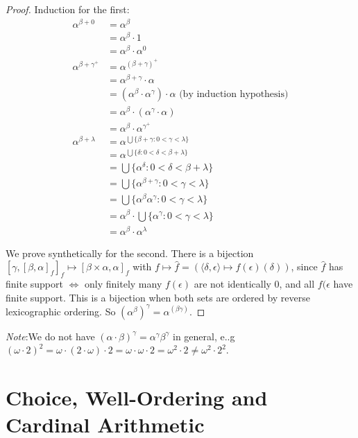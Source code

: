 \documentclass[a4paper]{article}
\theoremstyle{definition}
\newcommand{\note}{\noindent \emph{Note}:\;}
\newcommand{\bra}{\langle}
\newcommand{\ket}{\rangle}
\let\stdsection\section
\renewcommand\section{\newpage\stdsection}
\begin{document}
\begin{proof}
  Induction for the first:
  \begin{align*}
    \alpha^{\beta + 0} &= \alpha^\beta\\
    &= \alpha^\beta\cdot 1\\
    &= \alpha^\beta \cdot \alpha^0\\
    \alpha^{\beta + \gamma^+} &= \alpha^{(\beta + \gamma)^+}\\
    &= \alpha^{\beta + \gamma}\cdot \alpha\\
    &= (\alpha^\beta\cdot \alpha^\gamma)\cdot \alpha\text{ (by induction hypothesis)}\\
    &= \alpha^\beta\cdot(\alpha^\gamma\cdot \alpha)\\
    &= \alpha^\beta\cdot \alpha^{\gamma^+}\\
    \alpha^{\beta + \lambda}&= \alpha^{\bigcup\{\beta + \gamma : 0 < \gamma < \lambda\}}\\
    &= \alpha^{\bigcup\{\delta: 0 < \delta < \beta + \lambda\}}\\
    &= \bigcup \{\alpha^\delta:0 < \delta < \beta + \lambda\}\\
    &= \bigcup \{\alpha^{\beta + \gamma} : 0 < \gamma < \lambda\}\\
    &= \bigcup \{\alpha^{\beta} \alpha^{\gamma} : 0 < \gamma < \lambda\}\\
    &= \alpha^{\beta}\cdot \bigcup \{ \alpha^{\gamma} : 0 < \gamma < \lambda\}\\
    &= \alpha^\beta\cdot \alpha^\lambda
  \end{align*}

  We prove synthetically for the second. There is a bijection $[\gamma, [\beta, \alpha]_f]_f\mapsto[\beta\times\alpha, \alpha]_f$ with $f\mapsto \hat f = (\bra \delta, \epsilon\ket \mapsto f(\epsilon)(\delta))$, since $\hat f$ has finite support $\Leftrightarrow$ only finitely many $f(\epsilon)$ are not identically 0, and all $f(\epsilon$ have finite support. This is a bijection when both sets are ordered by reverse lexicographic ordering. So $(\alpha^\beta)^\gamma = \alpha^(\beta\gamma)$.
\end{proof}

\note We do not have $(\alpha\cdot \beta)^\gamma = \alpha^\gamma\beta^\gamma$ in general, e..g $(\omega\cdot 2)^2 = \omega\cdot (2 \cdot \omega)\cdot 2 = \omega\cdot \omega \cdot 2 = \omega^2 \cdot 2 \not= \omega^2 \cdot 2^2$.

\section{Choice, Well-Ordering and Cardinal Arithmetic}
\end{document}

